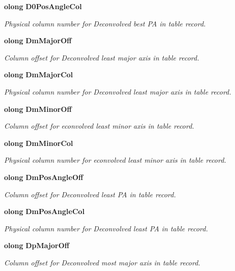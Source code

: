 \begin{CompactItemize}
{\bf olong} {\bf D0Pos\-Angle\-Col}
\begin{CompactList}\small\item\em Physical column number for Deconvolved best PA in table record. \item\end{CompactList}\item 
{\bf olong} {\bf Dm\-Major\-Off}
\begin{CompactList}\small\item\em Column offset for Deconvolved least major axis in table record. \item\end{CompactList}\item 
{\bf olong} {\bf Dm\-Major\-Col}
\begin{CompactList}\small\item\em Physical column number for Deconvolved least major axis in table record. \item\end{CompactList}\item 
{\bf olong} {\bf Dm\-Minor\-Off}
\begin{CompactList}\small\item\em Column offset for econvolved least minor axis in table record. \item\end{CompactList}\item 
{\bf olong} {\bf Dm\-Minor\-Col}
\begin{CompactList}\small\item\em Physical column number for econvolved least minor axis in table record. \item\end{CompactList}\item 
{\bf olong} {\bf Dm\-Pos\-Angle\-Off}
\begin{CompactList}\small\item\em Column offset for Deconvolved least PA in table record. \item\end{CompactList}\item 
{\bf olong} {\bf Dm\-Pos\-Angle\-Col}
\begin{CompactList}\small\item\em Physical column number for Deconvolved least PA in table record. \item\end{CompactList}\item 
{\bf olong} {\bf Dp\-Major\-Off}
\begin{CompactList}\small\item\em Column offset for Deconvolved most major axis in table record. \item\end{CompactList}\item 

\end{CompactItemize}
